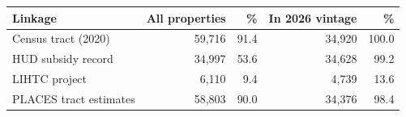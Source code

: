 \begin{tabular}{lrrrr}
\toprule
Linkage & All properties & \% & In 2026 vintage & \% \\
\midrule
Census tract (2020) & 59,716 & 91.4 & 34,920 & 100.0 \\
HUD subsidy record & 34,997 & 53.6 & 34,628 & 99.2 \\
LIHTC project & 6,110 & 9.4 & 4,739 & 13.6 \\
PLACES tract estimates & 58,803 & 90.0 & 34,376 & 98.4 \\
\bottomrule
\end{tabular}
